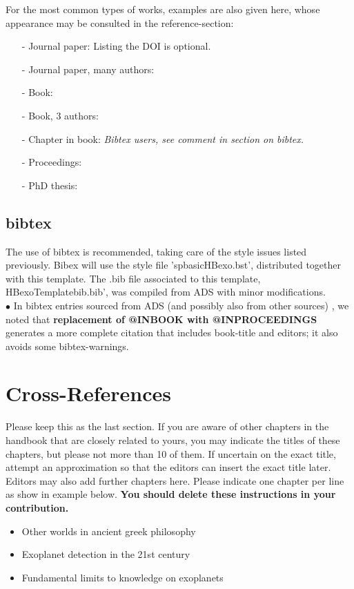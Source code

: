 \documentclass[graybox,natbib,nosecnum]{svmult}
\begin{document}
For the most common types of works, examples are also given here, whose appearance may be consulted in the reference-section: 
\begin{itemize}
\item[-]{Journal paper: \citep{2013A&A...550A..67P} Listing the DOI is optional. }
\item[-]{Journal paper, many authors: \citep{almenara09} }
\item[-]{Book: \citep{all73}  }
\item[-]{Book, 3 authors: \citep{giclas+71}  }
\item[-]{Chapter in book: \citep{2015hae..book.1501B}  \emph{Bibtex users, see comment in section on bibtex.} }
\item[-]{Proceedings:  \citep{Boisnard06}  }
\item[-]{PhD thesis: \citep{AlmenaraThesis10}  }
\end{itemize}

\subsection{bibtex}
The use of bibtex is recommended, taking care of the style issues listed previously. Bibex will use the style file 'spbasicHBexo.bst', distributed together with this template. The  .bib file associated to this template, HBexoTemplatebib.bib', was compiled from ADS with minor modifications.\\

$\bullet$ In bibtex entries sourced from ADS (and possibly also from other sources) , we noted that {\bf replacement of @INBOOK with @INPROCEEDINGS} generates a more complete citation that includes book-title and editors; it also avoids some bibtex-warnings.

\section{Cross-References}
Please keep this as the last section. If you are aware of other chapters in the handbook that are closely related to yours, you may indicate the titles of these chapters, but please not more than 10 of them. If uncertain on the exact title, attempt an approximation so that the editors can insert the exact title later. Editors may also add further chapters here. Please indicate one chapter per line as show in example below. {\bf You should delete these instructions in your contribution.}
\begin{itemize}
\item{Other worlds in ancient greek philosophy}
\item{Exoplanet detection in the 21st century}
\item{Fundamental limits to knowledge on exoplanets}
\end{itemize}
\end{document}
